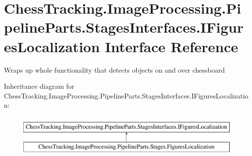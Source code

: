 \hypertarget{interface_chess_tracking_1_1_image_processing_1_1_pipeline_parts_1_1_stages_interfaces_1_1_i_figures_localization}{}\section{Chess\+Tracking.\+Image\+Processing.\+Pipeline\+Parts.\+Stages\+Interfaces.\+I\+Figures\+Localization Interface Reference}
\label{interface_chess_tracking_1_1_image_processing_1_1_pipeline_parts_1_1_stages_interfaces_1_1_i_figures_localization}


Wraps up whole functionality that detects objects on and over chessboard  


Inheritance diagram for Chess\+Tracking.\+Image\+Processing.\+Pipeline\+Parts.\+Stages\+Interfaces.\+I\+Figures\+Localization\+:\begin{figure}[H]
\begin{center}
\leavevmode
\includegraphics[height=2.000000cm]{interface_chess_tracking_1_1_image_processing_1_1_pipeline_parts_1_1_stages_interfaces_1_1_i_figures_localization}
\end{center}
\end{figure}
